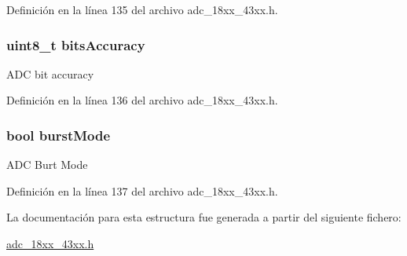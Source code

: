 Definición en la línea 135 del archivo adc\+\_\+18xx\+\_\+43xx.\+h.

\subsubsection[{\texorpdfstring{bits\+Accuracy}{bitsAccuracy}}]{\setlength{\rightskip}{0pt plus 5cm}uint8\+\_\+t bits\+Accuracy}\hypertarget{struct_a_d_c___c_l_o_c_k___s_e_t_u_p___t_a415ce3b64ae72d6b88a82bf4dc93a146}{}\label{struct_a_d_c___c_l_o_c_k___s_e_t_u_p___t_a415ce3b64ae72d6b88a82bf4dc93a146}
A\+DC bit accuracy 

Definición en la línea 136 del archivo adc\+\_\+18xx\+\_\+43xx.\+h.

\subsubsection[{\texorpdfstring{burst\+Mode}{burstMode}}]{\setlength{\rightskip}{0pt plus 5cm}bool burst\+Mode}\hypertarget{struct_a_d_c___c_l_o_c_k___s_e_t_u_p___t_a9cf04ac4acb35c092c82ed4b4a3db4d5}{}\label{struct_a_d_c___c_l_o_c_k___s_e_t_u_p___t_a9cf04ac4acb35c092c82ed4b4a3db4d5}
A\+DC Burt Mode 

Definición en la línea 137 del archivo adc\+\_\+18xx\+\_\+43xx.\+h.



La documentación para esta estructura fue generada a partir del siguiente fichero\+:\begin{DoxyCompactItemize}
\item 
\hyperlink{adc__18xx__43xx_8h}{adc\+\_\+18xx\+\_\+43xx.\+h}\end{DoxyCompactItemize}
